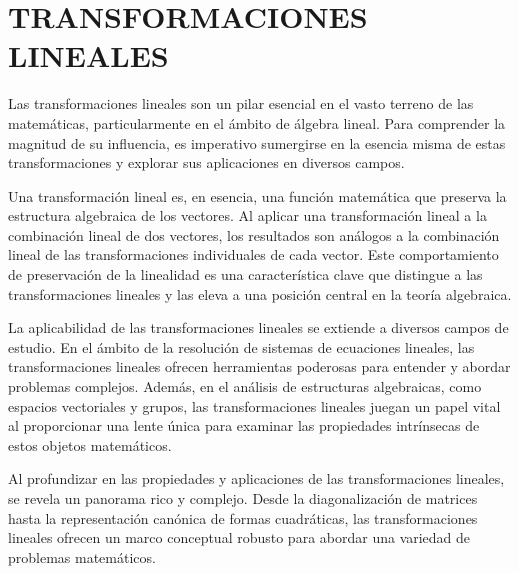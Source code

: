 \chapter[TRANSFORMACIONES LINEALES]{TRANSFORMACIONES \\ LINEALES}
\printchaptertableofcontents

Las transformaciones lineales son un pilar esencial en el vasto terreno de las matemáticas, particularmente en el ámbito de álgebra lineal. Para comprender la magnitud de su influencia, es imperativo sumergirse en la esencia misma de estas transformaciones y explorar sus aplicaciones en diversos campos.

Una transformación lineal es, en esencia, una función matemática que preserva la estructura algebraica de los vectores. Al aplicar una transformación lineal a la combinación lineal de dos vectores, los resultados son análogos a la combinación lineal de las transformaciones individuales de cada vector. Este comportamiento de preservación de la linealidad es una característica clave que distingue a las transformaciones lineales y las eleva a una posición central en la teoría algebraica.


La aplicabilidad de las transformaciones lineales se extiende a diversos campos de estudio. En el ámbito de la resolución de sistemas de ecuaciones lineales, las transformaciones lineales ofrecen herramientas poderosas para entender y abordar problemas complejos. Además, en el análisis de estructuras algebraicas, como espacios vectoriales y grupos, las transformaciones lineales juegan un papel vital al proporcionar una lente única para examinar las propiedades intrínsecas de estos objetos matemáticos.

Al profundizar en las propiedades y aplicaciones de las transformaciones lineales, se revela un panorama rico y complejo. Desde la diagonalización de matrices hasta la representación canónica de formas cuadráticas, las transformaciones lineales ofrecen un marco conceptual robusto para abordar una variedad de problemas matemáticos.

